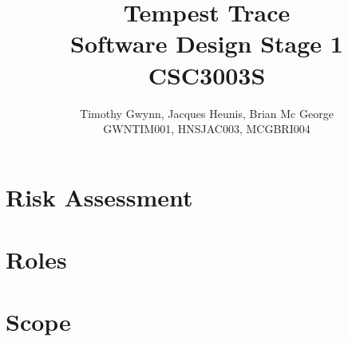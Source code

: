 \documentclass[a4paper,10pt]{article}
\title{Tempest Trace \\
Software Design Stage 1
\\
CSC3003S}
\author{Timothy Gwynn, Jacques Heunis, Brian Mc George\\
GWNTIM001, HNSJAC003, MCGBRI004}
\begin{document}
\maketitle
\newpage
\tableofcontents
\newpage

\section{Risk Assessment}


\section{Roles}


\section{Scope}
\end{document}
